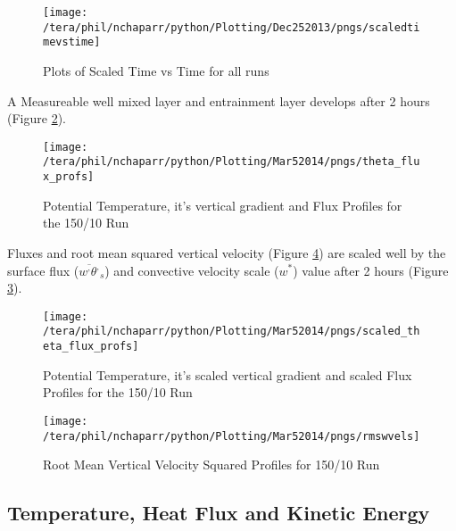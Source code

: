 \begin{figure}[!ht]
    \centering
    \texttt{[image: /tera/phil/nchaparr/python/Plotting/Dec252013/pngs/scaledtimevstime]}
    \caption{Plots of Scaled Time vs Time for all runs}
    \label{fig:ScaledTimevsTime}   %
\end{figure}

A Measureable well mixed layer and entrainment layer develops after 2 hours (Figure \ref{fig:tempgradfluxprofs15010}).\\

\begin{figure}[!ht]
    \centering
    \texttt{[image: /tera/phil/nchaparr/python/Plotting/Mar52014/pngs/theta\_flux\_profs]}
    \caption{Potential Temperature, it's vertical gradient and Flux Profiles for the 150/10 Run}
    \label{fig:tempgradfluxprofs15010}   %
\end{figure}

Fluxes and root mean squared vertical velocity (Figure \ref{fig:rmswvelprofs15010}) are scaled well by the surface flux ($\overline{w^{,}\theta^{,}}_{s}$) and convective velocity scale ($w^{*}$) value after 2 hours (Figure \ref{fig:scaledtempgradfluxprofs15010}).\\


\begin{figure}[!ht]
    \centering
    \texttt{[image: /tera/phil/nchaparr/python/Plotting/Mar52014/pngs/scaled\_theta\_flux\_profs]}
    \caption{Potential Temperature, it's scaled vertical gradient and scaled Flux Profiles for the 150/10 Run}
    \label{fig:scaledtempgradfluxprofs15010}   %
\end{figure}

\begin{figure}[!ht]
    \centering
    \texttt{[image: /tera/phil/nchaparr/python/Plotting/Mar52014/pngs/rmswvels]}
    \caption{Root Mean Vertical Velocity Squared Profiles for 150/10 Run}
    \label{fig:rmswvelprofs15010}   %
\end{figure}

\subsection{Temperature, Heat Flux and Kinetic Energy}

